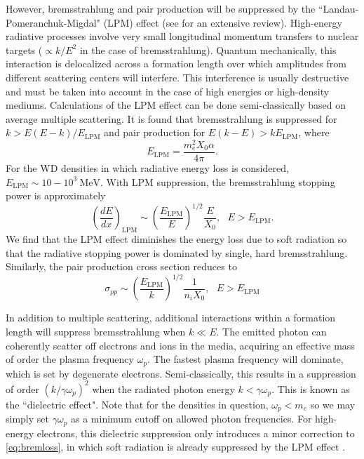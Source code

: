 \documentclass[twocolumn,showpacs,preprintnumbers,amsmath,amssymb,prd]{revtex4}
\def\r{\right)}
\def\l{\left(}
\begin{document}
\begin{appendices}
However, bremsstrahlung and pair production will be suppressed by the ``Landau-Pomeranchuk-Migdal" (LPM) effect (see \cite{Klein:1998du} for an extensive review). High-energy radiative processes involve very small longitudinal momentum transfers to nuclear targets ($\propto k/E^2$ in the case of bremsstrahlung). Quantum mechanically, this interaction is delocalized across a formation length over which amplitudes from different scattering centers will interfere. This interference is usually destructive and must be taken into account in the case of high energies or high-density mediums. Calculations of the LPM effect can be done semi-classically based on average multiple scattering. It is found that bremsstrahlung is suppressed for $k > E(E-k)/E_\text{LPM}$ and pair production for $E(k-E) > k E_\text{LPM}$, where
\begin{equation}
\label{eq:LPM}
E_\text{LPM} = \frac{m_e^2 X_0 \alpha}{4 \pi}.
\end{equation}
For the WD densities in which radiative energy loss is considered, $E_\text{LPM} \sim 10-10^{3} ~\text{MeV}$. With LPM suppression, the bremsstrahlung stopping power is approximately
\begin{equation}
\label{eq:bremloss}
\l\frac{dE}{dx}\r_\text{LPM} \sim \l\frac{E_\text{LPM}}{E} \r^{1/2} \frac{E}{X_0}, ~~~ E>E_\text{LPM}.
\end{equation}
We find that the LPM effect diminishes the energy loss due to soft radiation so that the radiative stopping power is dominated by single, hard bremsstrahlung. Similarly, the pair production cross section reduces to
\begin{equation}
\sigma_{pp} \sim \l\frac{E_\text{LPM}}{k} \r^{1/2} \frac{1}{n_i X_0}, ~~~ E>E_\text{LPM}
\end{equation}

In addition to multiple scattering, additional interactions within a formation length will suppress bremsstrahlung when $k \ll E$. The emitted photon can coherently scatter off electrons and ions in the media, acquiring an effective mass of order the plasma frequency $\omega_p$. The fastest plasma frequency will dominate, which is set by degenerate electrons.
Semi-classically, this results in a suppression of order $(k/\gamma \omega_p)^2$ when the radiated photon energy $k < \gamma \omega_p $. This is known as the ``dielectric effect". Note that for the densities in question, $\omega_p < m_e$ so we may simply set $\gamma \omega_p$ as a minimum cutoff on allowed photon frequencies. For high-energy electrons, this dielectric suppression only introduces a minor correction to \eqref{eq:bremloss}, in which soft radiation is already suppressed by the LPM effect \cite{Klein:1998du}.


\end{appendices}
\end{document}
